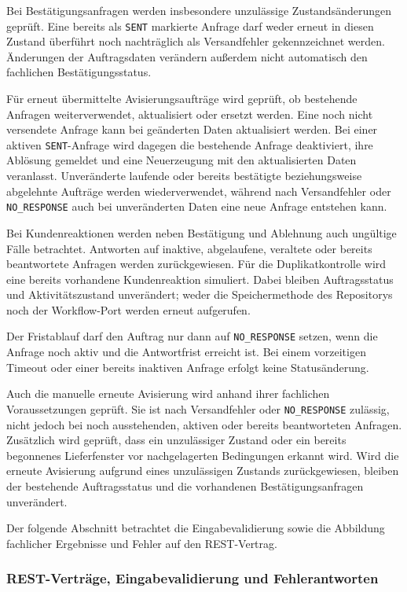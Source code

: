 \documentclass[
  12pt,
  a4paper,
  oneside
]{article}
\begin{document}
Bei Bestätigungsanfragen werden insbesondere unzulässige Zustandsänderungen
geprüft. Eine bereits als \texttt{SENT} markierte Anfrage darf weder erneut in
diesen Zustand überführt noch nachträglich als Versandfehler gekennzeichnet
werden. Änderungen der Auftragsdaten verändern außerdem nicht automatisch den
fachlichen Bestätigungsstatus.

Für erneut übermittelte Avisierungsaufträge wird geprüft, ob bestehende Anfragen
weiterverwendet, aktualisiert oder ersetzt werden. Eine noch nicht versendete
Anfrage kann bei geänderten Daten aktualisiert werden. Bei einer aktiven
\texttt{SENT}-Anfrage wird dagegen die bestehende Anfrage deaktiviert, ihre
Ablösung gemeldet und eine Neuerzeugung mit den aktualisierten Daten veranlasst.
Unveränderte laufende oder bereits bestätigte beziehungsweise abgelehnte
Aufträge werden wiederverwendet, während nach Versandfehler oder
\texttt{NO\_RESPONSE} auch bei unveränderten Daten eine neue Anfrage entstehen
kann.

Bei Kundenreaktionen werden neben Bestätigung und Ablehnung auch ungültige Fälle
betrachtet. Antworten auf inaktive, abgelaufene, veraltete oder bereits
beantwortete Anfragen werden zurückgewiesen. Für die Duplikatkontrolle wird eine
bereits vorhandene Kundenreaktion simuliert. Dabei bleiben Auftragsstatus und
Aktivitätszustand unverändert; weder die Speichermethode des Repositorys noch
der Workflow-Port werden erneut aufgerufen.

Der Fristablauf darf den Auftrag nur dann auf \texttt{NO\_RESPONSE} setzen, wenn
die Anfrage noch aktiv und die Antwortfrist erreicht ist. Bei einem vorzeitigen
Timeout oder einer bereits inaktiven Anfrage erfolgt keine Statusänderung.

Auch die manuelle erneute Avisierung wird anhand ihrer fachlichen
Voraussetzungen geprüft. Sie ist nach Versandfehler oder \texttt{NO\_RESPONSE}
zulässig, nicht jedoch bei noch ausstehenden, aktiven oder bereits beantworteten
Anfragen. Zusätzlich wird geprüft, dass ein unzulässiger Zustand oder ein
bereits begonnenes Lieferfenster vor nachgelagerten Bedingungen erkannt wird.
Wird die erneute Avisierung aufgrund eines unzulässigen Zustands zurückgewiesen,
bleiben der bestehende Auftragsstatus und die vorhandenen
Bestätigungsanfragen unverändert.

Der folgende Abschnitt betrachtet die Eingabevalidierung sowie die Abbildung
fachlicher Ergebnisse und Fehler auf den REST-Vertrag.

\subsubsection{REST-Verträge, Eingabevalidierung und Fehlerantworten}
\label{sec:test-rest-vertraege-fehlerantworten}
\end{document}

